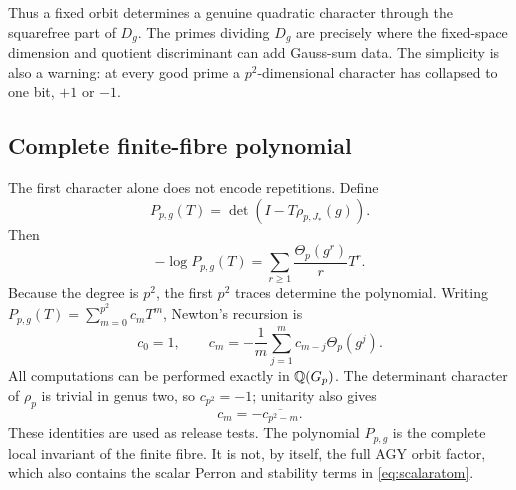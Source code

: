 Thus a fixed orbit determines a genuine quadratic character through the
squarefree part of \(D_g\).  The primes dividing \(D_g\) are precisely where
the fixed-space dimension and quotient discriminant can add Gauss-sum data.
The simplicity is also a warning: at every good prime a
\(p^2\)-dimensional character has collapsed to one bit, \(+1\) or \(-1\).

\subsection{Complete finite-fibre polynomial}

The first character alone does not encode repetitions.  Define
\[
P_{p,g}(T)=\det(I-T\rho_{p,J_*}(g)).
\]
Then
\begin{equation}
-\log P_{p,g}(T)
=\sum_{r\ge1}\frac{\Theta_p(g^r)}rT^r.
\label{eq:local-log}
\end{equation}
Because the degree is \(p^2\), the first \(p^2\) traces determine the
polynomial.  Writing \(P_{p,g}(T)=\sum_{m=0}^{p^2}c_mT^m\), Newton's recursion
is
\begin{equation}
c_0=1,
\qquad
c_m=-\frac1m\sum_{j=1}^m c_{m-j}\Theta_p(g^j).
\label{eq:newton}
\end{equation}
All computations can be performed exactly in \(\mathbb{Q}(G_p)\).  The determinant
character of \(\rho_p\) is trivial in genus two, so \(c_{p^2}=-1\); unitarity
also gives
\[
c_m=-\overline{c_{p^2-m}}.
\]
These identities are used as release tests.  The polynomial
\(P_{p,g}\) is the complete local invariant of the finite fibre.  It is not,
by itself, the full AGY orbit factor, which also contains the scalar Perron
and stability terms in \cref{eq:scalaratom}.
